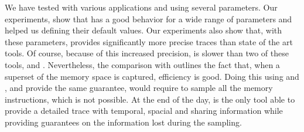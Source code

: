 We have tested \Moca with various applications and using several parameters.
Our experiments, show that \Moca has a good behavior for a wide range of
parameters and helped us defining their default values. Our experiments also
show that, with these parameters, \Moca provides significantly more precise traces
than state of the art tools.
Of course, because of this increased precision, \Moca is slower than two of these tools,
\MemProf and \Mitos.
Nevertheless, the comparison with \TABARNAC outlines the fact that, when a superset of the memory
space is captured, \Moca efficiency is good.
Doing this using \MemProf and \Mitos, and provide the same guarantee, would require to sample all the memory instructions, which is not possible.
At the end of the day, \Moca is the only tool able to provide a
detailed trace with temporal, spacial and sharing information while providing
guarantees on the information lost during the sampling.
